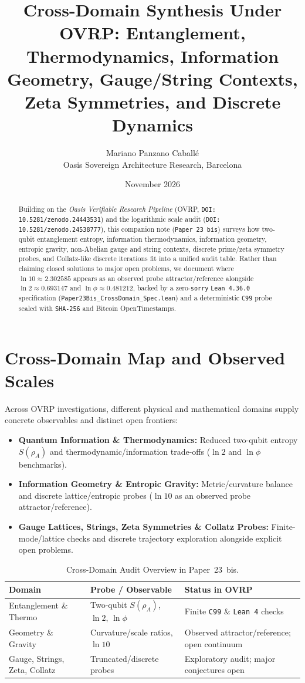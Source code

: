 \documentclass[11pt,a4paper]{article}
\title{Cross-Domain Synthesis Under OVRP: Entanglement, Thermodynamics, Information Geometry, Gauge/String Contexts, Zeta Symmetries, and Discrete Dynamics}
\author{Mariano Panzano Caball\'e \\ \small Oasis Sovereign Architecture Research, Barcelona}
\date{November 2026}
\begin{document}
\maketitle

\begin{abstract}
Building on the \emph{Oasis Verifiable Research Pipeline} (OVRP, \texttt{DOI: 10.5281/zenodo.24443531}) and the logarithmic scale audit (\texttt{DOI: 10.5281/zenodo.24538777}), this companion note (\texttt{Paper~23~bis}) surveys how two-qubit entanglement entropy, information thermodynamics, information geometry, entropic gravity, non-Abelian gauge and string contexts, discrete prime/zeta symmetry probes, and Collatz-like discrete iterations fit into a unified audit table. Rather than claiming closed solutions to major open problems, we document where $\ln 10 \approx 2.302585$ appears as an observed probe attractor/reference alongside $\ln 2 \approx 0.693147$ and $\ln \phi \approx 0.481212$, backed by a zero-\texttt{sorry} \texttt{Lean~4.36.0} specification (\texttt{Paper23Bis\_CrossDomain\_Spec.lean}) and a deterministic \texttt{C99} probe sealed with \texttt{SHA-256} and Bitcoin OpenTimestamps.
\end{abstract}

\section{Cross-Domain Map and Observed Scales}
Across OVRP investigations, different physical and mathematical domains supply concrete observables and distinct open frontiers:
\begin{itemize}
  \item \textbf{Quantum Information \& Thermodynamics:} Reduced two-qubit entropy $S(\rho_A)$ and thermodynamic/information trade-offs ($\ln 2$ and $\ln \phi$ benchmarks).
  \item \textbf{Information Geometry \& Entropic Gravity:} Metric/curvature balance and discrete lattice/entropic probes ($\ln 10$ as an observed probe attractor/reference).
  \item \textbf{Gauge Lattices, Strings, Zeta Symmetries \& Collatz Probes:} Finite-mode/lattice checks and discrete trajectory exploration alongside explicit open problems.
\end{itemize}

\begin{table}[h!]
\centering
\caption{Cross-Domain Audit Overview in Paper~23~bis.}
\begin{tabular}{lll}
\hline
Domain & Probe / Observable & Status in OVRP \\
\hline
Entanglement \& Thermo & Two-qubit $S(\rho_A)$, $\ln 2$, $\ln \phi$ & Finite \texttt{C99} \& \texttt{Lean~4} checks \\
Geometry \& Gravity & Curvature/scale ratios, $\ln 10$ & Observed attractor/reference; open continuum \\
Gauge, Strings, Zeta, Collatz & Truncated/discrete probes & Exploratory audit; major conjectures open \\
\hline
\end{tabular}
\end{table}
\end{document}

